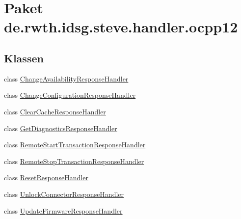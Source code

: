 \hypertarget{namespacede_1_1rwth_1_1idsg_1_1steve_1_1handler_1_1ocpp12}{\section{Paket de.\+rwth.\+idsg.\+steve.\+handler.\+ocpp12}
\label{namespacede_1_1rwth_1_1idsg_1_1steve_1_1handler_1_1ocpp12}
}
\subsection*{Klassen}
\begin{DoxyCompactItemize}
\item 
class \hyperlink{classde_1_1rwth_1_1idsg_1_1steve_1_1handler_1_1ocpp12_1_1_change_availability_response_handler}{Change\+Availability\+Response\+Handler}
\item 
class \hyperlink{classde_1_1rwth_1_1idsg_1_1steve_1_1handler_1_1ocpp12_1_1_change_configuration_response_handler}{Change\+Configuration\+Response\+Handler}
\item 
class \hyperlink{classde_1_1rwth_1_1idsg_1_1steve_1_1handler_1_1ocpp12_1_1_clear_cache_response_handler}{Clear\+Cache\+Response\+Handler}
\item 
class \hyperlink{classde_1_1rwth_1_1idsg_1_1steve_1_1handler_1_1ocpp12_1_1_get_diagnostics_response_handler}{Get\+Diagnostics\+Response\+Handler}
\item 
class \hyperlink{classde_1_1rwth_1_1idsg_1_1steve_1_1handler_1_1ocpp12_1_1_remote_start_transaction_response_handler}{Remote\+Start\+Transaction\+Response\+Handler}
\item 
class \hyperlink{classde_1_1rwth_1_1idsg_1_1steve_1_1handler_1_1ocpp12_1_1_remote_stop_transaction_response_handler}{Remote\+Stop\+Transaction\+Response\+Handler}
\item 
class \hyperlink{classde_1_1rwth_1_1idsg_1_1steve_1_1handler_1_1ocpp12_1_1_reset_response_handler}{Reset\+Response\+Handler}
\item 
class \hyperlink{classde_1_1rwth_1_1idsg_1_1steve_1_1handler_1_1ocpp12_1_1_unlock_connector_response_handler}{Unlock\+Connector\+Response\+Handler}
\item 
class \hyperlink{classde_1_1rwth_1_1idsg_1_1steve_1_1handler_1_1ocpp12_1_1_update_firmware_response_handler}{Update\+Firmware\+Response\+Handler}
\end{DoxyCompactItemize}
